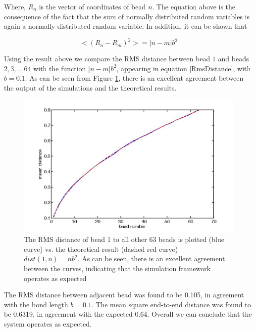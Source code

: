 \documentclass[12pt]{book}
\begin{document}
Where, $R_n$ is the vector of coordinates of bead $n$. The equation above is the consequence of the fact that the sum of normally distributed random variables is again a normally distributed random variable. In addition, it can be shown that 

\begin{equation}\label{RmsDistance}
<(R_n-R_m)^2>=|n-m|b^2
\end{equation}

Using the result above we compare the RMS distance between bead $1$ and beads $2,3,..,64$ with the function $|n-m|b^2$, appearing in equation \ref{RmsDistance}, with $b=0.1$. As can be seen from Figure \ref{figure_rmsDistanceBead1ToBeads2To64AndTheoreticalResults}, there is an excellent agreement between the output of the simulations and the theoretical results.

\begin{figure}[H]
\includegraphics[scale=0.3]{rmsDistanceBead1ToBeads2To64AndTheoreticalResults}
\caption{\scriptsize{The RMS distance of bead 1 to all other 63 beads is plotted (blue curve) vs. the theoretical result (dashed red curve) $dist(1,n)=nb^2$. As can be seen, there is an excellent agreement between the curves, indicating that the simulation framework operates as expected}}
\label{figure_rmsDistanceBead1ToBeads2To64AndTheoreticalResults}
\end{figure}

The RMS distance between adjacent bead was found to be 0.105, in agreement with  the bond length $b=0.1$. The mean square end-to-end distance was found to be 0.6319, in agreement with the expected 0.64. Overall we can conclude that the system operates as expected.
\end{document}
